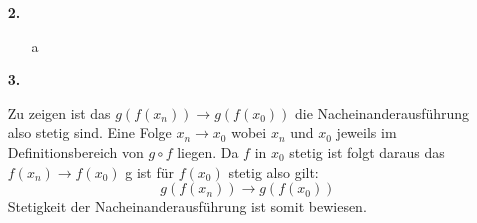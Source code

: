 \documentclass[a4paper,11pt]{scrartcl}
\begin{document}
\begin{enumerate}
    \item[\textbf{2.}]
        \begin{enumerate}
            \item[a]

        \end{enumerate}
    \item[\textbf{3.}]
        \begin{enumerate}
            Zu zeigen ist das $g(f(x_n)) \rightarrow g(f(x_0))$ die Nacheinanderausführung also stetig sind.
            Eine Folge $x_n \rightarrow x_0$ wobei $x_n$ und $x_0$ jeweils im Definitionsbereich von $g \circ f$ liegen. Da $f$ in $x_0$ stetig ist folgt daraus das $f(x_n) \rightarrow f(x_0)$ g ist für $f(x_0)$ stetig also gilt: $$g(f(x_n)) \rightarrow g(f(x_0))$$
            Stetigkeit der Nacheinanderausführung ist somit bewiesen.
        \end{enumerate}
\end{enumerate}
\end{document}
